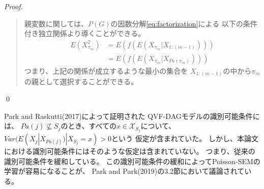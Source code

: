 \begin{proof}
\begin{quote}
    親変数に関しては、$P(G)$の因数分解\eqref{eq:factorization}による
    以下の条件付き独立関係より導くことができる。
    \begin{align*}
      E(X_{\pi_m}^2) &= E(f(E(X_{\pi_m} | X_{1:(m-1)}))) \\
                     &= E(f(E(X_{\pi_m} | X_{Pa(\pi_m)})))
    \end{align*}
    つまり、上記の関係が成立するような最小の集合を
    $X_{1:(m-1)}$の中から$\pi_m$の親として選択することができる。
  \end{quote}
\qed
\end{proof}

Park and Raskutti(2017)\cite{Park2017-hw}によって証明された
QVF-DAGモデルの識別可能条件には、
$Pa(j) \nsubseteq S_j$のとき、すべての$x \in \mathcal X_{S_j}$について、
$\mathit{Var}(E(X_j | X_{Pa(j)}) | X_{S_j} = x) > 0$という
仮定が含まれていた。
しかし、本論文における識別可能条件にはそのような仮定は含まれていない。
つまり、従来の識別可能条件\cite{Park2017-hw}を緩和している。
この識別可能条件の緩和によってPoisson-SEMの学習が容易になることが、
Park and Park(2019)\cite{Park2019-qy}の3.2節において議論されている。
